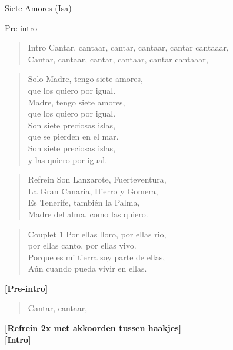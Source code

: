 \begin{song}[vals]{Siete Amores (Isa)}
\begin{instrumental}{Pre-intro}
   \\
   
\end{instrumental}

\begin{verse}{Intro}
Cantar, cantaar, cantar, cantaar, cantar cantaaar,\\
Cantar, cantaar, cantar, cantaar, cantar cantaaar,\\
\end{verse}

\begin{verse}{Solo}
Madre, tengo siete amores,\\
que los quiero por igual.\\
Madre, tengo siete amores,\\
que los quiero por igual.\\
Son siete preciosas islas,\\
que se pierden en el mar.\\
Son siete preciosas islas,\\
y las quiero por igual.\hspace{1.5em}\hspace{1.5em}\\
\end{verse}
\begin{verse}{Refrein}
Son Lanzarote, Fuerteventura,\\
La Gran Canaria, Hierro y Gomera,\\
Es Tenerife, también la Palma,\\
Madre del alma, como las quiero.\\
\end{verse}
\begin{verse}{Couplet 1}
Por ellas lloro, por ellas rio,\\
por ellas canto, por ellas vivo.\\
Porque es mi tierra soy parte de ellas,\\
Aún cuando pueda vivir en ellas.\hspace{2.5em}\hspace{1.5em}\\
\end{verse}
\textbf{[Pre-intro]}\\
\begin{verse}{}
Cantar, cantaar,\\
\end{verse}
\textbf{[Refrein 2x met akkoorden tussen haakjes]}\\
\textbf{[Intro]}




\end{song}
